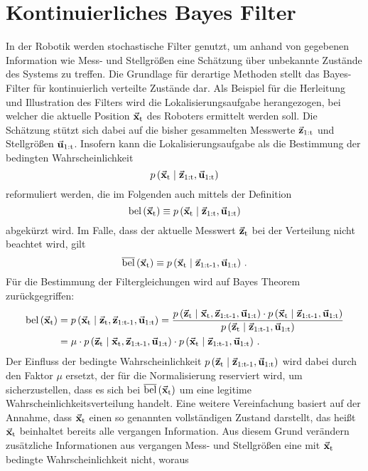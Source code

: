 \section{Kontinuierliches Bayes Filter} 
In der Robotik werden stochastische Filter genutzt, um anhand von gegebenen Information wie Mess- und Stellgrößen eine Schätzung über unbekannte Zustände des Systems zu treffen. Die Grundlage für derartige Methoden stellt das Bayes-Filter für kontinuierlich verteilte Zustände dar. Als Beispiel für die Herleitung und Illustration des Filters wird die Lokalisierungsaufgabe herangezogen, bei welcher die aktuelle Position $\vec{\mathbf{x}}_{\text{t}}$ des Roboters ermittelt werden soll. Die Schätzung stützt sich dabei auf die bisher gesammelten Messwerte $\vec{\mathbf{z}}_{\text{1:t}}$ und Stellgrößen $\vec{\mathbf{u}}_{\text{1:t}}$. Insofern kann die Lokalisierungsaufgabe als die Bestimmung der bedingten Wahrscheinlichkeit
\begin{equation}
p\left({\vec{\mathbf{x}}_{\text{t}}} \hspace{1mm} \vert \hspace{1mm} {\vec{\mathbf{z}}_{\text{1:t}},\vec{\mathbf{u}}_{\text{1:t}}}\right)
\end{equation}
reformuliert werden, die im Folgenden auch mittels der Definition
\begin{equation}
\text{bel}\left({\vec{\mathbf{x}}_{\text{t}}}\right) \equiv p\left({\vec{\mathbf{x}}_{\text{t}}} \hspace{1mm} \vert \hspace{1mm} {\vec{\mathbf{z}}_{\text{1:t}},\vec{\mathbf{u}}_{\text{1:t}}}\right)
\end{equation}
abgekürzt wird. Im Falle, dass der aktuelle Messwert $\vec{\mathbf{z}}_{\text{t}}$ bei der Verteilung nicht beachtet wird, gilt
\begin{equation}
\overline{\text{bel}}\left({\vec{\mathbf{x}}_{\text{t}}}\right) \equiv p\left({\vec{\mathbf{x}}_{\text{t}}} \hspace{1mm} \vert \hspace{1mm} {\vec{\mathbf{z}}_{\text{1:t-1}},\vec{\mathbf{u}}_{\text{1:t}}}\right)\,.
\end{equation}
Für die Bestimmung der Filtergleichungen wird auf Bayes Theorem zurückgegriffen:
\begin{equation}
\begin{split}
\text{bel}\left({\vec{\mathbf{x}}_{\text{t}}}\right) &= p\left({\vec{\mathbf{x}}_{\text{t}}} \hspace{1mm} \vert \hspace{1mm} {\vec{\mathbf{z}}_{\text{t}},\vec{\mathbf{z}}_{\text{1:t-1}},\vec{\mathbf{u}}_{\text{1:t}}}\right) = \frac{ p\left({\vec{\mathbf{z}}_{\text{t}}} \hspace{1mm} \vert \hspace{1mm} {\vec{\mathbf{x}}_{\text{t}},\vec{\mathbf{z}}_{\text{1:t-1}},\vec{\mathbf{u}}_{\text{1:t}}}\right)\cdot p\left({\vec{\mathbf{x}}_{\text{t}}} \hspace{1mm} \vert \hspace{1mm} {\vec{\mathbf{z}}_{\text{1:t-1}},\vec{\mathbf{u}}_{\text{1:t}}}\right)}{p\left({\vec{\mathbf{z}}_{\text{t}}} \hspace{1mm} \vert \hspace{1mm} {\vec{\mathbf{z}}_{\text{1:t-1}}, \vec{\mathbf{u}}_{\text{1:t}}}\right)}
\\
&= \mu \cdot p\left({\vec{\mathbf{z}}_{\text{t}}} \hspace{1mm} \vert \hspace{1mm} {\vec{\mathbf{x}}_{\text{t}},\vec{\mathbf{z}}_{\text{1:t-1}},\vec{\mathbf{u}}_{\text{1:t}}}\right)\cdot p\left({\vec{\mathbf{x}}_{\text{t}}} \hspace{1mm} \vert \hspace{1mm} {\vec{\mathbf{z}}_{\text{1:t-1}},\vec{\mathbf{u}}_{\text{1:t}}}\right)\,.
\end{split}
\end{equation}
Der Einfluss der bedingte Wahrscheinlichkeit $p\left({\vec{\mathbf{z}}_{\text{t}}} \hspace{1mm} \vert \hspace{1mm} {\vec{\mathbf{z}}_{\text{1:t-1}}, \vec{\mathbf{u}}_{\text{1:t}}}\right)$ wird dabei durch den Faktor $\mu$ ersetzt, der für die Normalisierung reserviert wird, um sicherzustellen, dass es sich bei $\overline{\text{bel}}\left({\vec{\mathbf{x}}_{\text{t}}}\right)$ um eine legitime Wahrscheinlichkeitsverteilung handelt. Eine weitere Vereinfachung basiert auf der Annahme, dass $\vec{\mathbf{x}}_{\text{t}}$ einen so genannten vollständigen Zustand darstellt, das heißt $\vec{\mathbf{x}}_{\text{t}}$ beinhaltet bereits alle vergangen Information. Aus diesem Grund verändern zusätzliche Informationen aus vergangen Mess- und Stellgrößen eine mit $\vec{\mathbf{x}}_{\text{t}}$ bedingte Wahrscheinlichkeit nicht, woraus 

